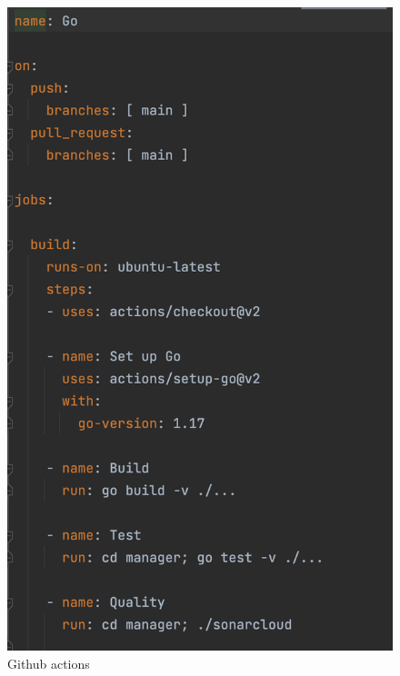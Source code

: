         \begin{figure}[H]
            \centering
            \includegraphics[scale = 0.7]{part/Proyecto_ejecutivo/memoria_constructiva/cicd}
            \caption{Github actions}\label{fig:cicd}
        \end{figure}